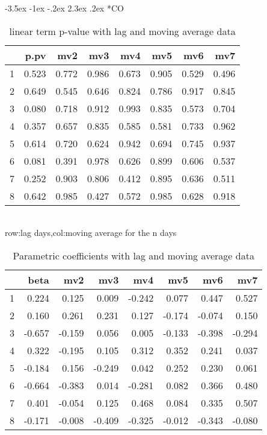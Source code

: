 \documentclass[a4paper, 12pt]{article}
\makeatletter
\def\large{\fontsize{14}{20}\selectfont}
\renewcommand\subsection{\@startsection {subsection}{1}{\z@}%
                                   {-3.5ex \@plus -1ex \@minus -.2ex}%
                                   {2.3ex \@plus.2ex}%
                                   {\centering\normalfont\large\bfseries}}
\makeatother
\begin{document}
\subsection*{CO}
\begin{table}[h]
\centering
\caption{linear term p-value with lag and moving average data}
\begin{tabular}{rrrrrrrr}
  \hline
 & p.pv & mv2 & mv3 & mv4 & mv5 & mv6 & mv7 \\
  \hline
1 & 0.523 & 0.772 & 0.986 & 0.673 & 0.905 & 0.529 & 0.496 \\
  2 & 0.649 & 0.545 & 0.646 & 0.824 & 0.786 & 0.917 & 0.845 \\
  3 & 0.080 & 0.718 & 0.912 & 0.993 & 0.835 & 0.573 & 0.704 \\
  4 & 0.357 & 0.657 & 0.835 & 0.585 & 0.581 & 0.733 & 0.962 \\
  5 & 0.614 & 0.720 & 0.624 & 0.942 & 0.694 & 0.745 & 0.937 \\
  6 & 0.081 & 0.391 & 0.978 & 0.626 & 0.899 & 0.606 & 0.537 \\
  7 & 0.252 & 0.903 & 0.806 & 0.412 & 0.895 & 0.636 & 0.511 \\
  8 & 0.642 & 0.985 & 0.427 & 0.572 & 0.985 & 0.628 & 0.918 \\
   \hline
\end{tabular}
\\row:lag days,col:moving average for the n days
\end{table}
\begin{table}[h]
\centering
\caption{Parametric coefficients with lag and moving average data}
\begin{tabular}{rrrrrrrr}
  \hline
 & beta & mv2 & mv3 & mv4 & mv5 & mv6 & mv7 \\
  \hline
1 & 0.224 & 0.125 & 0.009 & -0.242 & 0.077 & 0.447 & 0.527 \\
  2 & 0.160 & 0.261 & 0.231 & 0.127 & -0.174 & -0.074 & 0.150 \\
  3 & -0.657 & -0.159 & 0.056 & 0.005 & -0.133 & -0.398 & -0.294 \\
  4 & 0.322 & -0.195 & 0.105 & 0.312 & 0.352 & 0.241 & 0.037 \\
  5 & -0.184 & 0.156 & -0.249 & 0.042 & 0.252 & 0.230 & 0.061 \\
  6 & -0.664 & -0.383 & 0.014 & -0.281 & 0.082 & 0.366 & 0.480 \\
  7 & 0.401 & -0.054 & 0.125 & 0.468 & 0.084 & 0.335 & 0.507 \\
  8 & -0.171 & -0.008 & -0.409 & -0.325 & -0.012 & -0.343 & -0.080 \\
   \hline
\end{tabular}
\end{table}
\clearpage
\end{document}
